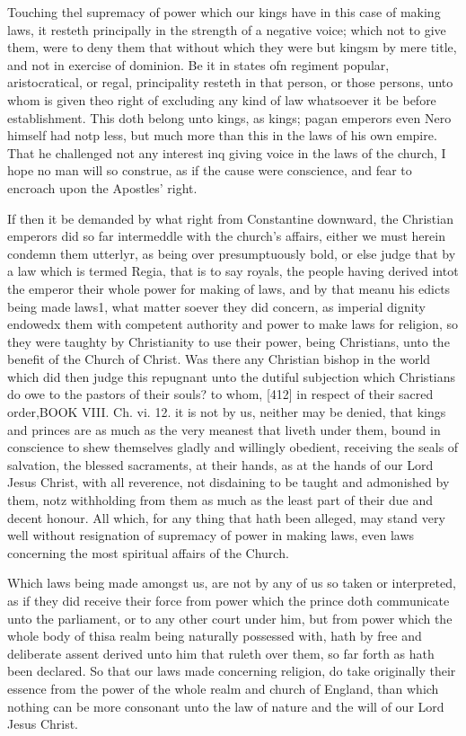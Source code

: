 Touching thel supremacy of power which our kings have in this case of making laws, it resteth principally in the strength of a negative voice; which not to give them, were to deny them that without which they were but kingsm by mere title, and not in exercise of dominion. Be it in states ofn regiment popular, aristocratical, or regal, principality resteth in that person, or those persons, unto whom is given theo right of excluding any kind of law whatsoever it be before establishment. This doth belong unto kings, as kings; pagan emperors even Nero himself had notp less, but much more than this in the laws of his own empire. That he challenged not any interest inq giving voice in the laws of the church, I hope no man will so construe, as if the cause were conscience, and fear to encroach upon the Apostles’ right.

If then it be demanded by what right from Constantine downward, the Christian emperors did so far intermeddle with the church’s affairs, either we must herein condemn them utterlyr, as being over presumptuously bold, or else judge that by a law which is termed Regia, that is to say royals, the people having derived intot the emperor their whole power for making of laws, and by that meanu his edicts being made laws1, what matter soever they did concern, as imperial dignity endowedx them with competent authority and power to make laws for religion, so they were taughty by Christianity to use their power, being Christians, unto the benefit of the Church of Christ. Was there any Christian bishop in the world which did then judge this repugnant unto the dutiful subjection which Christians do owe to the pastors of their souls? to whom, [412] in respect of their sacred order,BOOK VIII. Ch. vi. 12. it is not by us, neither may be denied, that kings and princes are as much as the very meanest that liveth under them, bound in conscience to shew themselves gladly and willingly obedient, receiving the seals of salvation, the blessed sacraments, at their hands, as at the hands of our Lord Jesus Christ, with all reverence, not disdaining to be taught and admonished by them, notz withholding from them as much as the least part of their due and decent honour. All which, for any thing that hath been alleged, may stand very well without resignation of supremacy of power in making laws, even laws concerning the most spiritual affairs of the Church.

Which laws being made amongst us, are not by any of us so taken or interpreted, as if they did receive their force from power which the prince doth communicate unto the parliament, or to any other court under him, but from power which the whole body of thisa realm being naturally possessed with, hath by free and deliberate assent derived unto him that ruleth over them, so far forth as hath been declared. So that our laws made concerning religion, do take originally their essence from the power of the whole realm and church of England, than which nothing can be more consonant unto the law of nature and the will of our Lord Jesus Christ.

